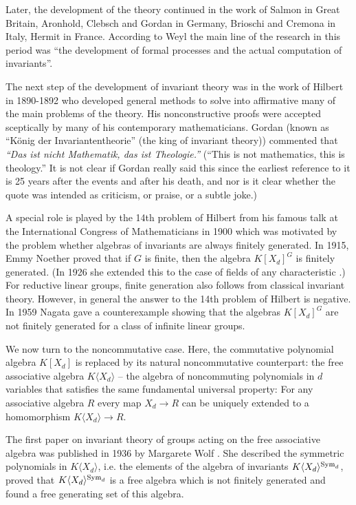 \documentclass{amsart}
\theoremstyle{definition}
\begin{document}
Later, the development of the theory continued in the work of Salmon in Great Britain, Aronhold, Clebsch and  Gordan
in Germany, Brioschi and Cremona in Italy, Hermit in France.
According to Weyl the main line of the research in this period was ``the development of formal processes and the actual computation of invariants''.

The next step of the development of invariant theory was in the work of Hilbert in 1890-1892
who developed general methods to solve into affirmative many of the main problems of the theory.
His nonconstructive proofs were accepted sceptically by many of his contemporary mathematicians.
Gordan (known as ``K\"onig der Invariantentheorie'' (the king of invariant theory)) commented that
{\it ``Das ist nicht Mathematik, das ist Theologie.''} (``This is not mathematics, this is theology.''
It is not clear if Gordan really said this since the earliest reference to it is 25 years after the events and after his death,
and nor is it clear whether the quote was intended as criticism, or praise, or a subtle joke.)

A special role is played by the  14th problem of Hilbert \cite{Hi2} from his famous talk at the International Congress of Mathematicians in 1900
which was motivated by the problem whether algebras of invariants are always finitely generated.
In 1915, Emmy Noether \cite{No1} proved that if $G$ is finite, then the algebra $K[X_d]^G$ is finitely generated. (In 1926 she extended this to the case of fields of any characteristic \cite{No2}.)
For reductive linear groups, finite generation also follows from classical invariant theory. However, in general the answer to the 14th problem of Hilbert is negative.
In 1959 Nagata \cite{Na} gave a counterexample showing that the algebras $K[X_d]^G$ are not finitely generated for a class of infinite linear groups.

We now turn to the noncommutative case. Here, the commutative polynomial algebra $K[X_d]$ is replaced by its natural noncommutative counterpart:
the free associative algebra $K\langle X_d\rangle$ -- the algebra of noncommuting polynomials in $d$ variables that satisfies the same fundamental universal property:
For any associative algebra $R$ every map $X_d\to R$ can be uniquely extended to a homomorphism $K\langle X_d\rangle \to R$.

The first paper on invariant theory of groups acting on the free associative algebra was published in 1936 by Margarete Wolf \cite{Wo}. She described the symmetric polynomials in
$K\langle X_d\rangle$, i.e. the elements of the algebra of invariants $K\langle X_d\rangle^{\text{\rm Sym}_d}$, proved that $K\langle X_d\rangle^{\text{\rm Sym}_d}$ is a free algebra which is not finitely generated
and found a free generating set of this algebra.
\end{document}
